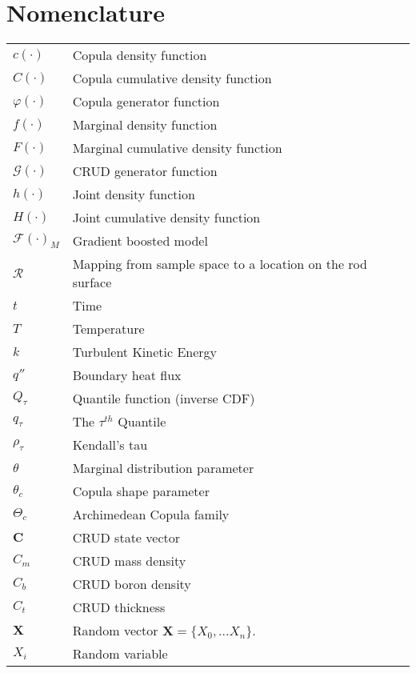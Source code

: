 \pagebreak

\section*{Nomenclature}
\begin{tabular}{l l}
$c(\cdot)$ & Copula density function \\
$C(\cdot)$ & Copula cumulative density function \\
$\varphi(\cdot)$ & Copula generator function \\
$f(\cdot)$ & Marginal density function \\
$F(\cdot)$ & Marginal cumulative density function \\
$\mathcal G(\cdot)$ & CRUD generator function \\
$h(\cdot)$ & Joint density function \\
$H(\cdot)$ & Joint cumulative density function \\
$\mathcal F(\cdot)_M$ & Gradient boosted model \\
$\mathcal R$ & Mapping from sample space to a location on the rod surface \\
$t$ & Time \\
$T$ & Temperature \\
$k$ & Turbulent Kinetic Energy \\
$q''$ & Boundary heat flux \\
$Q_{\tau}$ & Quantile function (inverse CDF) \\
$q_{\tau}$ & The $\tau^{th}$ Quantile \\
$\rho_{\tau}$ & Kendall's tau \\
$\theta$ & Marginal distribution parameter \\
$\theta_c$ & Copula shape parameter \\
$\Theta_c$ & Archimedean Copula family \\
$\mathbf C$ & CRUD state vector \\
$C_m$ & CRUD mass density \\
$C_b$ & CRUD boron density \\
$C_t$ & CRUD thickness \\
$\mathbf X$ & Random vector $\mathbf X = \{X_0, ... X_n\}$. \\
$X_i$ & Random variable \\
\end{tabular}


\listoftables

\listoffigures

\pagebreak
